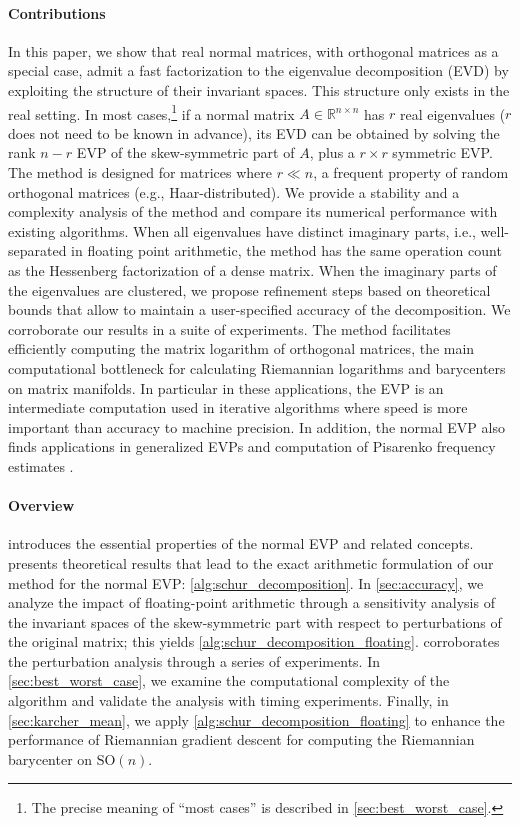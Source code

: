 \documentclass[10pt,twoside,dvipsnames]{siamart1116}
\numberwithin{algorithm}{section}
\numberwithin{equation}{section}
\begin{document}
\paragraph{Contributions} In this paper, we show that real normal matrices, with orthogonal matrices as a special case,  admit a fast factorization to the eigenvalue decomposition (EVD) by exploiting the structure of their invariant spaces. This structure only exists in the real setting. In most cases,\footnote{The precise meaning of ``most cases'' is described in \cref{sec:best_worst_case}.} if a normal matrix $A\in\mathbb{R}^{n\times n}$ has $r$ real eigenvalues ($r$ does not need to be known in advance), its EVD can be obtained by solving the rank $n-r$ EVP of the skew-symmetric part of $A$, plus a $r\times r$ symmetric EVP. The method is designed for matrices where $r\ll n$, a frequent property of random orthogonal matrices (e.g., Haar-distributed). We provide a stability and a complexity analysis of the method and compare its numerical performance with existing algorithms. When all eigenvalues have distinct imaginary parts, i.e., well-separated in floating point arithmetic, the method has the same operation count as the Hessenberg factorization of a dense matrix. %
When the imaginary parts of the eigenvalues are clustered, we propose refinement steps based on theoretical bounds that allow to maintain a user-specified accuracy of the decomposition. We corroborate our results in a suite of experiments. The method facilitates efficiently computing the matrix logarithm of orthogonal matrices, the main computational bottleneck for calculating Riemannian logarithms and barycenters on matrix manifolds. In particular in these applications, the EVP is an intermediate computation used in iterative algorithms where speed is more important than accuracy to machine precision. In addition, the normal EVP also finds applications in generalized EVPs \cite{BUNSEGERSTNER1991741,CHARLIER1990} and computation of Pisarenko frequency estimates \cite{Ammar1988determination, Cybenko85}.   
\paragraph{Overview} 
 introduces the essential properties of the normal EVP and related concepts.  presents theoretical results that lead to the exact arithmetic formulation of our method for the normal EVP: \cref{alg:schur_decomposition}. In \cref{sec:accuracy}, we analyze the impact of floating-point arithmetic through a sensitivity analysis of the invariant spaces of the skew-symmetric part with respect to perturbations of the original matrix; this yields \cref{alg:schur_decomposition_floating}.  corroborates the perturbation analysis through a series of experiments. In \cref{sec:best_worst_case}, we examine the computational complexity of the algorithm and validate the analysis with timing experiments. Finally, in \cref{sec:karcher_mean}, we apply \cref{alg:schur_decomposition_floating} to enhance the performance of Riemannian gradient descent for computing the Riemannian barycenter on $\mathrm{SO}(n)$.
\end{document}
